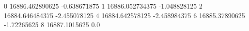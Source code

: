 0 16886.462890625 -0.638671875
1 16886.052734375 -1.048828125
2 16884.646484375 -2.455078125
4 16884.642578125 -2.458984375
6 16885.37890625 -1.72265625
8 16887.1015625 0.0
